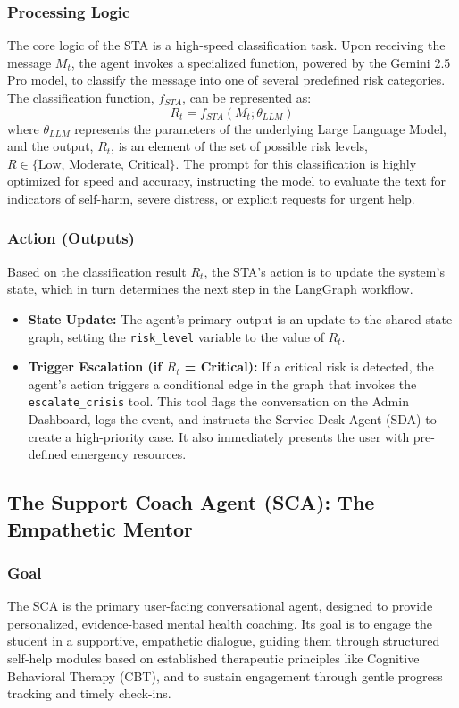 \subsubsection{Processing Logic}
The core logic of the STA is a high-speed classification task. Upon receiving the message $M_t$, the agent invokes a specialized function, powered by the Gemini 2.5 Pro model, to classify the message into one of several predefined risk categories. The classification function, $f_{STA}$, can be represented as:
$$ R_t = f_{STA}(M_t; \theta_{LLM}) $$
where $\theta_{LLM}$ represents the parameters of the underlying Large Language Model, and the output, $R_t$, is an element of the set of possible risk levels, $R \in \{\text{Low, Moderate, Critical}\}$. The prompt for this classification is highly optimized for speed and accuracy, instructing the model to evaluate the text for indicators of self-harm, severe distress, or explicit requests for urgent help.

\subsubsection{Action (Outputs)}
Based on the classification result $R_t$, the STA's action is to update the system's state, which in turn determines the next step in the LangGraph workflow.
\begin{itemize}
    \item \textbf{State Update:} The agent's primary output is an update to the shared state graph, setting the \texttt{risk\_level} variable to the value of $R_t$.
    \item \textbf{Trigger Escalation (if $R_t$ = Critical):} If a critical risk is detected, the agent's action triggers a conditional edge in the graph that invokes the \texttt{escalate\_crisis} tool. This tool flags the conversation on the Admin Dashboard, logs the event, and instructs the Service Desk Agent (SDA) to create a high-priority case. It also immediately presents the user with pre-defined emergency resources.
\end{itemize}

\subsection{The Support Coach Agent (SCA): The Empathetic Mentor}

\subsubsection{Goal}
The SCA is the primary user-facing conversational agent, designed to provide personalized, evidence-based mental health coaching. Its goal is to engage the student in a supportive, empathetic dialogue, guiding them through structured self-help modules based on established therapeutic principles like Cognitive Behavioral Therapy (CBT), and to sustain engagement through gentle progress tracking and timely check-ins.


